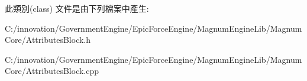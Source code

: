 此類別(class) 文件是由下列檔案中產生\+:\begin{DoxyCompactItemize}
\item 
C\+:/innovation/\+Government\+Engine/\+Epic\+Force\+Engine/\+Magnum\+Engine\+Lib/\+Magnum\+Core/Attributes\+Block.\+h\item 
C\+:/innovation/\+Government\+Engine/\+Epic\+Force\+Engine/\+Magnum\+Engine\+Lib/\+Magnum\+Core/Attributes\+Block.\+cpp\end{DoxyCompactItemize}
